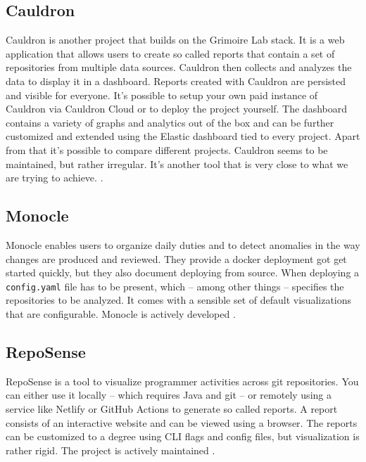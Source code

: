\documentclass[authoryear,preprint,review,12pt]{elsarticle}
\newcommand{\code}[1]{\colorbox{mygray}{\vphantom{Tg}\lstinline|#1|}}
\begin{document}
\subsection{Cauldron}
\label{sec:summary:cauldron}

Cauldron is another project that builds on the Grimoire Lab stack. It is a web application that
allows users to create so called reports that contain a set of repositories from multiple data
sources. Cauldron then collects and analyzes the data to display it in a dashboard. Reports created
with Cauldron are persisted and visible for everyone. It's possible to setup your own paid instance
of Cauldron via Cauldron Cloud \citep{CauldronCloud} or to deploy the project yourself. The
dashboard contains a variety of graphs and analytics out of the box and can be further customized
and extended using the Elastic dashboard tied to every project. Apart from that it's possible to
compare different projects. Cauldron seems to be maintained, but rather irregular. It's another
tool that is very close to what we are trying to achieve.
\citep{CauldronCauldron,LevelSoftwareDevelopment}.

\subsection{Monocle}
\label{sec:summary:monocle}

Monocle enables users to organize daily duties and to detect anomalies in the way changes are
produced and reviewed. They provide a docker deployment got get started quickly, but they also
document deploying from source. When deploying a \code{config.yaml} file has to be present, which –
among other things – specifies the repositories to be analyzed. It comes with a sensible set of
default visualizations that are configurable. Monocle is actively developed \citep{Monocle2022}.

\subsection{RepoSense}
\label{sec:summary:reposense}

RepoSense is a tool to visualize programmer activities across git repositories. You can either use
it locally – which requires Java and git – or remotely using a service like Netlify or GitHub
Actions to generate so called reports. A report consists of an interactive website and can be
viewed using a browser. The reports can be customized to a degree using CLI flags and config files,
but visualization is rather rigid. The project is actively maintained \citep{RepoSense2022}.
\end{document}
